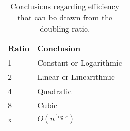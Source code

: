 \begin{table}[h]
\begin{tabular}{l|l}
Ratio & Conclusion              \\ \hline
1     & Constant or Logarithmic \\
2     & Linear or Linearithmic  \\
4     & Quadratic               \\
8     & Cubic                   \\
x     & $O(n^{\log x})$          
\end{tabular}
\label{table:ratios}
\caption{Conclusions regarding efficiency that can be drawn from the
doubling ratio.}
\end{table}
